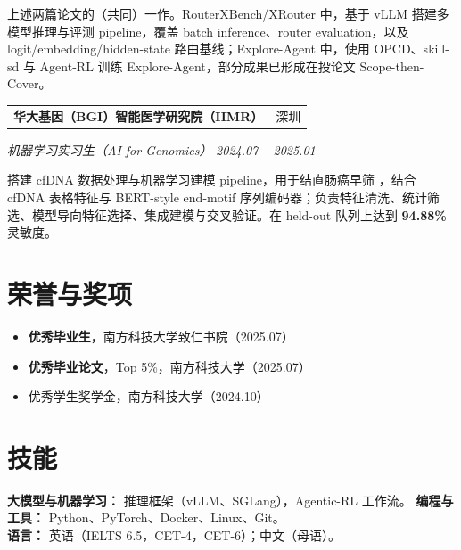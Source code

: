 \documentclass[10pt, a4paper]{article}
\makeatletter
\newcommand{\badge}[2]{%
  \tikz[baseline=(x.base)]{
    \node[inner xsep=3.5pt, inner ysep=1.6pt, rounded corners=2.5pt,
          draw=#1, line width=0.45pt,
          text=#1, font=\fontsize{6}{7}\selectfont\sffamily]
      (x) {#2};
  }%
}
\newcommand{\tgenomics}{\badge{taggenomics}{genomics}}
\newcommand{\entry}[2]{%
  \noindent
  \begin{tabularx}{\linewidth}{@{}X r@{}}
    \textbf{#1} & {\small\color{dategray}#2}
  \end{tabularx}%
  \par\vspace{0pt}%
}
\makeatother
\begin{document}
上述两篇论文的（共同）一作。RouterXBench/XRouter 中，基于 vLLM 搭建多模型推理与评测 pipeline，覆盖 batch inference、router evaluation，以及 logit/embedding/hidden-state 路由基线；Explore-Agent 中，使用 OPCD、skill-sd 与 Agent-RL 训练 Explore-Agent，部分成果已形成在投论文 Scope-then-Cover。

\vspace{2pt}
\entry{华大基因（BGI）智能医学研究院（IIMR）}{深圳}
\textit{机器学习实习生（AI for Genomics）} \hfill \textit{2024.07 -- 2025.01}

搭建 cfDNA 数据处理与机器学习建模 pipeline，用于结直肠癌早筛 \tgenomics，结合 cfDNA 表格特征与 BERT-style end-motif 序列编码器；负责特征清洗、统计筛选、模型导向特征选择、集成建模与交叉验证。在 held-out 队列上达到 \textbf{94.88\%} 灵敏度。

\section{荣誉与奖项}

\begin{itemize}[itemsep=0pt, topsep=1pt]
  \item \textbf{优秀毕业生}，南方科技大学致仁书院（2025.07）
  \item \textbf{优秀毕业论文}，Top 5\%，南方科技大学（2025.07）
  \item 优秀学生奖学金，南方科技大学（2024.10）
\end{itemize}

\section{技能}

\noindent\textbf{大模型与机器学习：} 推理框架（vLLM、SGLang），Agentic-RL 工作流。 \quad \textbf{编程与工具：} Python、PyTorch、Docker、Linux、Git。\\
\noindent\textbf{语言：} 英语（IELTS 6.5，CET-4，CET-6）；中文（母语）。
\end{document}
